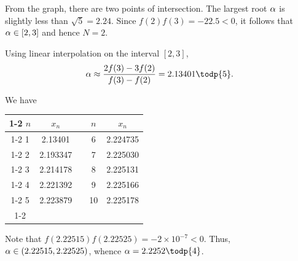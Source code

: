 \begin{solution}
\begin{ppart}
        From the graph, there are two points of intersection. The largest root $\alpha$ is slightly less than $\sqrt{5} = 2.24$. Since $f(2) f(3) = -22.5 < 0$, it follows that $\alpha \in [2, 3]$ and hence $N = 2$.
    \end{ppart}
    \begin{ppart}
        Using linear interpolation on the interval $[2, 3]$, \[\a \approx \frac{2f(3) - 3f(2)}{f(3) - f(2)} = 2.13401 \todp{5}.\]
    \end{ppart}
    \begin{ppart}
        We have
        \begin{table}[H]
            \centering
            \begin{tabular}{|c|c|l|c|c|}
            \cline{1-2} \cline{4-5}
            $n$ & $x_n$ &  & $n$ & $x_n$ \\ \cline{1-2} \cline{4-5} \cline{1-2} \cline{4-5}
            1 & 2.13401 &  & 6 & 2.224735 \\ \cline{1-2} \cline{4-5} 
            2 & 2.193347 &  & 7 & 2.225030 \\ \cline{1-2} \cline{4-5} 
            3 & 2.214178 &  & 8 & 2.225131 \\ \cline{1-2} \cline{4-5} 
            4 & 2.221392 &  & 9 & 2.225166 \\ \cline{1-2} \cline{4-5} 
            5 & 2.223879 &  & 10 & 2.225178 \\ \cline{1-2} \cline{4-5} 
            \end{tabular}
        \end{table}

        Note that $f(2.22515) f(2.22525) = -2 \times 10^{-7} < 0$. Thus, $\alpha \in (2.22515, 2.22525)$, whence $\a = 2.2252 \todp{4}$. 
    \end{ppart}
\end{solution}

